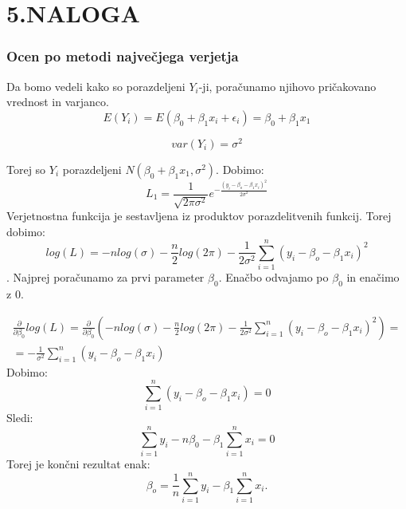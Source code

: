 \documentclass{article}
\begin{document}
\section*{5.NALOGA}
\subsubsection*{Ocen po metodi največjega verjetja}
Da bomo vedeli kako so porazdeljeni $Y_i$-ji, poračunamo njihovo pričakovano vrednost in varjanco.
\begin{equation*}
E(Y_i) = E(\beta_0+\beta_1x_i+\epsilon_i) = \beta_0+\beta_1x_1
\end{equation*}

\begin{equation*}
var(Y_i) = \sigma^2
\end{equation*}

Torej so $Y_i$ porazdeljeni $N( \beta_0+\beta_1x_1, \sigma^2)$.
Dobimo:
\begin{equation*}
L_1 = \frac{1}{\sqrt{2\pi \sigma^2}}e^{-{\frac{(y_i - \beta_o-\beta_1x_i)^2}{2\sigma^2}}}
\end{equation*}
Verjetnostna funkcija je sestavljena iz produktov porazdelitvenih funkcij. Torej dobimo:
\begin{equation*}
log(L) = -nlog(\sigma) - \frac{n}{2}log(2\pi)-\frac{1}{2\sigma^2}\sum_{i=1}^n (y_i-\beta_o-\beta_1x_i)^2
\end{equation*}.
Najprej poračunamo za prvi parameter $\beta_0$. Enačbo odvajamo po $\beta_0$ in enačimo z 0.

\begin{equation*}
\begin{split}
\frac{\partial}{\partial\beta_0} log(L) = \frac{\partial}{\partial\beta_0} (  -nlog(\sigma) - \frac{n}{2}log(2\pi)-\frac{1}{2\sigma^2}\sum_{i=1}^n (y_i-\beta_o-\beta_1x_i)^2)=\\
= -\frac{1}{\sigma^2}\sum_{i=1}^n(y_i-\beta_o-\beta_1x_i)
\end{split}
\end{equation*}
Dobimo:
\begin{equation*}
\sum_{i=1}^n(y_i-\beta_o-\beta_1x_i) = 0
\end{equation*}
Sledi:
\begin{equation*}
\sum_{i=1}^n y_i - n\beta_0 -\beta_1\sum_{i=1}^nx_i = 0
\end{equation*}
Torej je končni rezultat enak:
\begin{equation*}
\beta_o = \frac{1}{n} \sum_{i=1}^n y_i - \beta_1\sum_{i=1}^nx_i.
\end{equation*}
\end{document}
